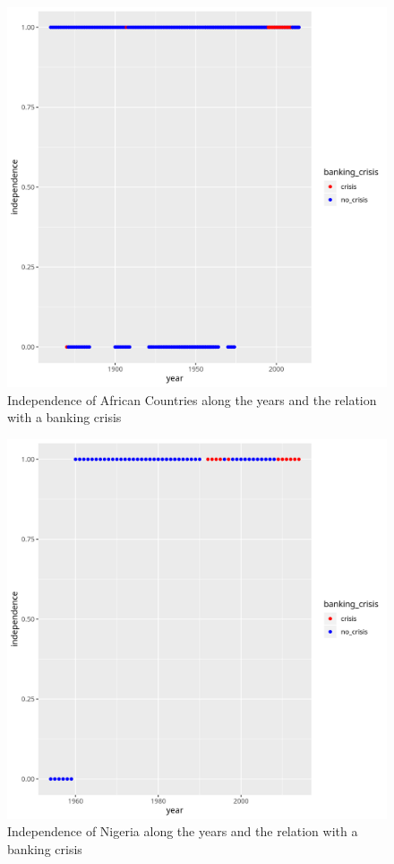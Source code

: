 \documentclass{article}
\begin{document}
    
    \begin{figure}[h!]
        \caption{Independence of African Countries along the years and the relation with a banking crisis}
        \includegraphics[scale=0.7]{plot5_general.png}
    \end{figure}
    \newpage
    \begin{figure}[h!]
        \caption{Independence of Nigeria along the years and the relation with a banking crisis}
        \includegraphics[scale=0.7]{plot5_nigeria.png}
    \end{figure}
\end{document}
